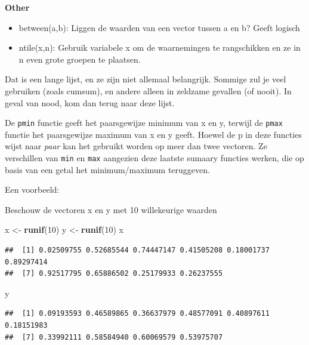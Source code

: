 \documentclass[]{tufte-book}
\newenvironment{Shaded}{}{}
\newcommand{\DecValTok}[1]{\textcolor[rgb]{0.25,0.63,0.44}{#1}}
\newcommand{\KeywordTok}[1]{\textcolor[rgb]{0.00,0.44,0.13}{\textbf{#1}}}
\newcommand{\NormalTok}[1]{#1}
\newcommand{\StringTok}[1]{\textcolor[rgb]{0.25,0.44,0.63}{#1}}
\providecommand{\tightlist}{%
  \setlength{\itemsep}{0pt}\setlength{\parskip}{0pt}}
\begin{document}
\textbf{Other}

\begin{itemize}
\tightlist
\item
  between(a,b): Liggen de waarden van een vector tussen a en b? Geeft logisch
\item
  ntile(x,n): Gebruik variabele x om de waarnemingen te rangschikken en ze in n even grote groepen te plaatsen.
\end{itemize}

Dat is een lange lijst, en ze zijn niet allemaal belangrijk. Sommige zul je veel gebruiken (zoals cumsum), en andere alleen in zeldzame gevallen (of nooit). In geval van nood, kom dan terug naar deze lijst.

De \texttt{pmin} functie geeft het paarsgewijze minimum van x en y, terwijl de \texttt{pmax} functie het paarsgewijze maximum van x en y geeft. Hoewel de p in deze functies wijst naar \emph{paar} kan het gebruikt worden op meer dan twee vectoren. Ze verschillen van \texttt{min} en \texttt{max} aangezien deze laatste sumaary functies werken, die op basis van een getal het minimum/maximum teruggeven.

Een voorbeeld:

Beschouw de vectoren x en y met 10 willekeurige waarden

\begin{Shaded}
\begin{Highlighting}[]
\NormalTok{x <-}\StringTok{ }\KeywordTok{runif}\NormalTok{(}\DecValTok{10}\NormalTok{)}
\NormalTok{y <-}\StringTok{ }\KeywordTok{runif}\NormalTok{(}\DecValTok{10}\NormalTok{)}
\NormalTok{x}
\end{Highlighting}
\end{Shaded}

\begin{verbatim}
##  [1] 0.02509755 0.52685544 0.74447147 0.41505208 0.18001737 0.89297414
##  [7] 0.92517795 0.65886502 0.25179933 0.26237555
\end{verbatim}

\begin{Shaded}
\begin{Highlighting}[]
\NormalTok{y}
\end{Highlighting}
\end{Shaded}

\begin{verbatim}
##  [1] 0.09193593 0.46589865 0.36637979 0.48577091 0.40897611 0.18151983
##  [7] 0.33992111 0.58584940 0.60069579 0.53975707
\end{verbatim}
\end{document}
